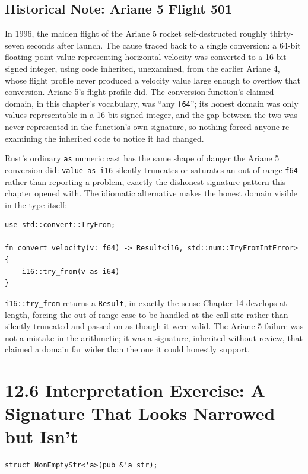 \documentclass[11pt]{book}
\begin{document}
\subsection*{Historical Note: Ariane 5 Flight 501}

In 1996, the maiden flight of the Ariane 5 rocket self-destructed roughly thirty-seven seconds after launch. The cause traced back to a single conversion: a 64-bit floating-point value representing horizontal velocity was converted to a 16-bit signed integer, using code inherited, unexamined, from the earlier Ariane 4, whose flight profile never produced a velocity value large enough to overflow that conversion. Ariane 5's flight profile did. The conversion function's claimed domain, in this chapter's vocabulary, was ``any \texttt{f64}''; its honest domain was only values representable in a 16-bit signed integer, and the gap between the two was never represented in the function's own signature, so nothing forced anyone re-examining the inherited code to notice it had changed.

Rust's ordinary \texttt{as} numeric cast has the same shape of danger the Ariane 5 conversion did: \texttt{value as i16} silently truncates or saturates an out-of-range \texttt{f64} rather than reporting a problem, exactly the dishonest-signature pattern this chapter opened with. The idiomatic alternative makes the honest domain visible in the type itself:

\begin{lstlisting}
use std::convert::TryFrom;

fn convert_velocity(v: f64) -> Result<i16, std::num::TryFromIntError> {
    i16::try_from(v as i64)
}
\end{lstlisting}

\texttt{i16::try\_from} returns a \texttt{Result}, in exactly the sense Chapter 14 develops at length, forcing the out-of-range case to be handled at the call site rather than silently truncated and passed on as though it were valid. The Ariane 5 failure was not a mistake in the arithmetic; it was a signature, inherited without review, that claimed a domain far wider than the one it could honestly support.

\section*{12.6 Interpretation Exercise: A Signature That Looks Narrowed but Isn't}

\begin{lstlisting}
struct NonEmptyStr<'a>(pub &'a str);
\end{lstlisting}
\end{document}
